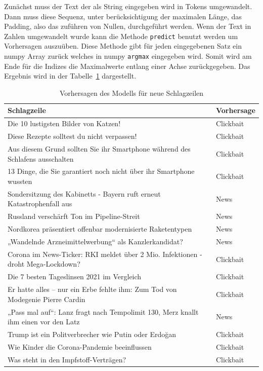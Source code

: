 Zunächst muss der Text der als String eingegeben wird in Tokens umgewandelt. Dann muss diese Sequenz, unter berücksichtigung der maximalen Länge, das Padding, also das zuführen von Nullen, durchgeführt werden. Wenn der Text in Zahlen umgewandelt wurde kann die Methode \texttt{predict} benutzt werden um Vorhersagen auszuüben. Diese Methode gibt für jeden eingegebenen Satz ein numpy Array zurück welches in numpy \texttt{argmax} eingegeben wird. Somit wird am Ende für die Indizes die Maximalwerte entlang einer Achse zurückgegeben. Das Ergebnis wird in der Tabelle~\ref{PredictNewTab} dargestellt.


\begin{table}[h]
    \caption{Vorhersagen des Modells für neue Schlagzeilen}
    \label{PredictNewTab}
    \renewcommand{\arraystretch}{1.2}
    \centering
    \sffamily
    \begin{footnotesize}
        \begin{tabular}{l l}
            \toprule
            \textbf{Schlagzeile}                  & \textbf{Vorhersage} \\
            \midrule
            Die 10 lustigsten Bilder von Katzen! & Clickbait \\
            Diese Rezepte solltest du nicht verpassen!  & Clickbait    \\
            Aus diesem Grund sollten Sie ihr Smartphone während des Schlafens ausschalten                  & Clickbait       \\
            13 Dinge, die Sie garantiert noch nicht über ihr Smartphone wussten   & Clickbait                   \\
            Sondersitzung des Kabinetts - Bayern ruft erneut Katastrophenfall aus   & News        \\
            Russland verschärft Ton im Pipeline-Streit  & News                     \\
            Nordkorea präsentiert offenbar modernisierte Raketentypen & News \\
            „Wandelnde Arzneimittelwerbung“ als Kanzlerkandidat? & News \\
            Corona im News-Ticker: RKI meldet über 2 Mio. Infektionen - droht Mega-Lockdown? & Clickbait \\
            Die 7 besten Tageslinsen 2021 im Vergleich & Clickbait \\
            Er hatte alles – nur ein Erbe fehlte ihm: Zum Tod von Modegenie Pierre Cardin & Clickbait \\
            „Pass mal auf“: Lanz fragt nach Tempolimit 130, Merz knallt ihm einen vor den Latz & News \\
            Trump ist ein Politverbrecher wie Putin oder Erdoğan & Clickbait \\
            Wie Kinder die Corona-Pandemie beeinflussen & Clickbait \\
            Was steht in den Impfstoff-Verträgen? & Clickbait \\
            \bottomrule
        \end{tabular}
    \end{footnotesize}
    \rmfamily
\end{table}

